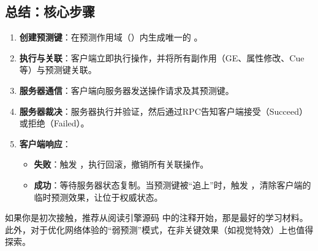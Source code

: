 \documentclass[10pt,CJKmath]{ctexart}
\begin{document}
	\subsection{总结：核心步骤}
	\begin{enumerate}
		\item \textbf{创建预测键}：在预测作用域（）内生成唯一的 。
		\item \textbf{执行与关联}：客户端立即执行操作，并将所有副作用（GE、属性修改、Cue等）与预测键关联。
		\item \textbf{服务器通信}：客户端向服务器发送操作请求及其预测键。
		\item \textbf{服务器裁决}：服务器执行并验证，然后通过RPC告知客户端接受（Succeed）或拒绝（Failed）。
		\item \textbf{客户端响应}：
		\begin{itemize}
			\item \textbf{失败}：触发 ，执行回滚，撤销所有关联操作。
			\item \textbf{成功}：等待服务器状态复制。当预测键被“追上”时，触发 ，清除客户端的临时预测效果，让位于权威状态。
		\end{itemize}
	\end{enumerate}
	
	如果你是初次接触，推荐从阅读引擎源码  中的注释开始，那是最好的学习材料。此外，对于优化网络体验的“弱预测”模式，在非关键效果（如视觉特效）上也值得探索。
	
\end{document}
